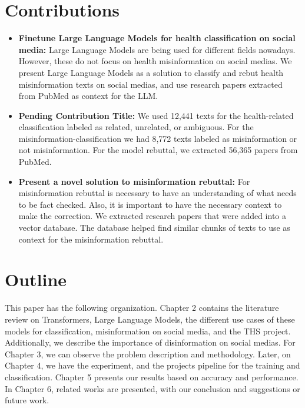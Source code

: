 \section{Contributions}
\noindent
\begin{itemize}
	\item \textbf{Finetune Large Language Models for health classification on social media:} Large Language Models are being used for different fields nowadays. However, these do not focus on health misinformation on social medias. We present Large Language Models as a solution
	to classify and rebut health misinformation texts on social medias, and use research papers extracted from PubMed as context for the LLM.
	\item \textbf{Pending Contribution Title:} We used 12,441 texts for the health-related classification labeled as related, unrelated, or ambiguous. For the misinformation-classification we had 8,772 texts labeled as misinformation or not misinformation. For the model rebuttal, we extracted
	56,365 papers from PubMed.
	\item \textbf{Present a novel solution to misinformation rebuttal:} For misinformation rebuttal is necessary to have an understanding of what needs to be fact checked. Also, it is important to have the necessary context to make the correction. We extracted research papers that were added into a
	vector database. The database helped find similar chunks of texts to use as context for the misinformation rebuttal. 
	
\end{itemize}

\section{Outline}
\noindent
This paper has the following organization. Chapter 2 contains the literature review on Transformers, Large Language Models,
the different use cases of these models for classification, misinformation on social media, and the THS project. Additionally, we describe the
importance of disinformation on social medias. For Chapter 3, we can observe the problem description and methodology.
Later, on Chapter 4, we have the experiment, and the projects pipeline for the training and classification. Chapter 5 presents
our results based on accuracy and performance. In Chapter 6, related works are presented, with our conclusion and suggestions 
or future work.